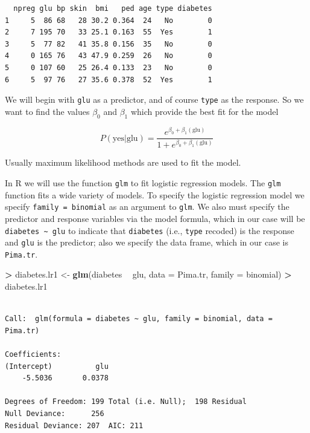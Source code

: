 \documentclass[]{krantz}
\makeatletter
\newenvironment{Shaded}{\begin{snugshade}}{\end{snugshade}}
\newcommand{\KeywordTok}[1]{\textcolor[rgb]{0.27,0.27,0.27}{\textbf{#1}}}
\newcommand{\DataTypeTok}[1]{\textcolor[rgb]{0.27,0.27,0.27}{#1}}
\newcommand{\StringTok}[1]{\textcolor[rgb]{0.5,0.5,0.5}{#1}}
\newcommand{\OperatorTok}[1]{\textcolor[rgb]{0.43,0.43,0.43}{\textbf{#1}}}
\newcommand{\NormalTok}[1]{#1}
\newenvironment{kframe}{%
\medskip{}
\setlength{\fboxsep}{.8em}
 \def\at@end@of@kframe{}%
 \ifinner\ifhmode%
  \def\at@end@of@kframe{\end{minipage}}%
  \begin{minipage}{\columnwidth}%
 \fi\fi%
 \def\FrameCommand##1{\hskip\@totalleftmargin \hskip-\fboxsep
 \colorbox{shadecolor}{##1}\hskip-\fboxsep
     \hskip-\linewidth \hskip-\@totalleftmargin \hskip\columnwidth}%
 \MakeFramed {\advance\hsize-\width
   \@totalleftmargin\z@ \linewidth\hsize
   \@setminipage}}%
 {\par\unskip\endMakeFramed%
 \at@end@of@kframe}
\renewenvironment{Shaded}{\begin{kframe}}{\end{kframe}}
\makeatother
\begin{document}
\begin{verbatim}
  npreg glu bp skin  bmi   ped age type diabetes
1     5  86 68   28 30.2 0.364  24   No        0
2     7 195 70   33 25.1 0.163  55  Yes        1
3     5  77 82   41 35.8 0.156  35   No        0
4     0 165 76   43 47.9 0.259  26   No        0
5     0 107 60   25 26.4 0.133  23   No        0
6     5  97 76   27 35.6 0.378  52  Yes        1
\end{verbatim}

We will begin with \texttt{glu} as a predictor, and of course
\texttt{type} as the response. So we want to find the values \(\beta_0\)
and \(\beta_1\) which provide the best fit for the model

\[
P(\text{yes} | \text{glu}) = \frac{e^{\beta_0 + \beta_1 (\text{glu})}}{1 + e^{\beta_0 + \beta_1 (\text{glu})}}
\]

Usually maximum likelihood methods are used to fit the model.

In R we will use the function \texttt{glm} to fit logistic regression
models. The \texttt{glm} function fits a wide variety of models. To
specify the logistic regression model we specify
\texttt{family\ =\ binomial} as an argument to \texttt{glm}. We also
must specify the predictor and response variables via the model formula,
which in our case will be \texttt{diabetes\ \textasciitilde{}\ glu} to
indicate that \texttt{diabetes} (i.e., \texttt{type} recoded) is the
response and \texttt{glu} is the predictor; also we specify the data
frame, which in our case is \texttt{Pima.tr}.

\begin{Shaded}
\begin{Highlighting}[]
\OperatorTok{>}\StringTok{ }\NormalTok{diabetes.lr1 <-}\StringTok{ }\KeywordTok{glm}\NormalTok{(diabetes }\OperatorTok{~}\StringTok{ }\NormalTok{glu, }\DataTypeTok{data =}\NormalTok{ Pima.tr, }\DataTypeTok{family =}\NormalTok{ binomial)}
\OperatorTok{>}\StringTok{ }\NormalTok{diabetes.lr1}
\end{Highlighting}
\end{Shaded}

\begin{verbatim}

Call:  glm(formula = diabetes ~ glu, family = binomial, data = Pima.tr)

Coefficients:
(Intercept)          glu  
    -5.5036       0.0378  

Degrees of Freedom: 199 Total (i.e. Null);  198 Residual
Null Deviance:      256 
Residual Deviance: 207  AIC: 211
\end{verbatim}
\end{document}
